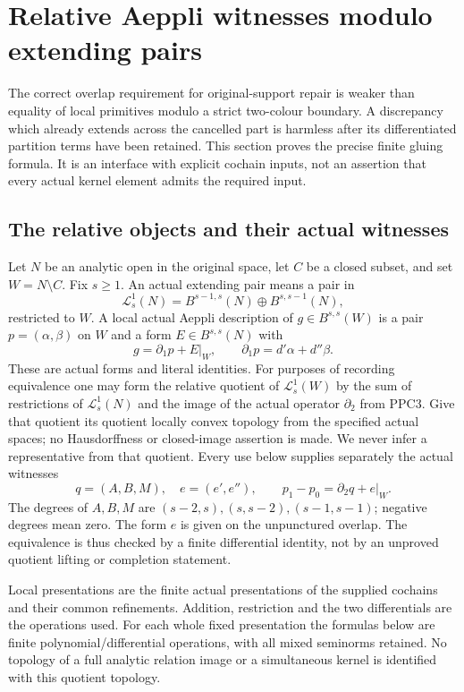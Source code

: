 \section{Relative Aeppli witnesses modulo extending pairs}
\label{sec:r9-relative-aeppli-gluing}

The correct overlap requirement for original-support repair is
weaker than equality of local primitives modulo a strict
two-colour boundary.  A discrepancy which already extends
across the cancelled part is harmless after its differentiated
partition terms have been retained.  This section proves the
precise finite gluing formula.  It is an interface with explicit
cochain inputs, not an assertion that every actual kernel
element admits the required input.

\subsection{The relative objects and their actual witnesses}

Let $N$ be an analytic open in the original space, let $C$ be
a closed subset, and set $W=N\setminus C$.  Fix $s\ge1$.
An actual extending pair means a pair in
\[
 \mathcal L^1_s(N)=B^{s-1,s}(N)\oplus B^{s,s-1}(N),
 \tag{RAG1}
\]
restricted to $W$.  A local actual Aeppli description of
$g\in B^{s,s}(W)$ is a pair $p=(\alpha,\beta)$ on $W$
and a form $E\in B^{s,s}(N)$ with
\[
                 g=\partial_1p+E|_W,
                     \qquad\partial_1p=d'\alpha+d''\beta.
 \tag{RAG2}
\]
These are actual forms and literal identities.  For purposes
of recording equivalence one may form the relative quotient
of $\mathcal L^1_s(W)$ by the sum of restrictions of
$\mathcal L^1_s(N)$ and the image of the actual operator
$\partial_2$ from PPC3.  Give that quotient its quotient
locally convex topology from the specified actual spaces;
no Hausdorffness or closed-image assertion is made.
We never infer a representative from that quotient.
Every use below supplies separately the actual witnesses
\[
             q=(A,B,M),\quad e=(e',e''),
          \qquad p_1-p_0=\partial_2q+e|_W.
 \tag{RAG3}
\]
The degrees of $A,B,M$ are $(s-2,s),(s,s-2),(s-1,s-1)$;
negative degrees mean zero.  The form $e$ is given on the
unpunctured overlap.  The equivalence is thus checked by a
finite differential identity, not by an unproved quotient
lifting or completion statement.

Local presentations are the finite actual presentations of
the supplied cochains and their common refinements.  Addition,
restriction and the two differentials are the operations used.
For each whole fixed presentation the formulas below are
finite polynomial/differential operations, with all mixed
seminorms retained.  No topology of a full analytic relation
image or a simultaneous kernel is identified with this
quotient topology.


